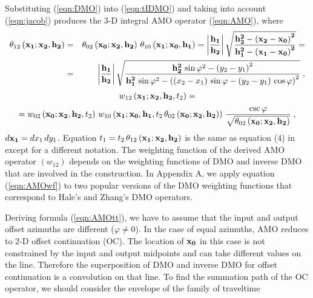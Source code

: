 \par
Substituting (\ref{eqn:DMO}) into (\ref{eqn:tIDMO}) and taking into account
(\ref{eqn:jacob}) produces the 3-D integral AMO operator (\ref{eqn:AMO}),
where
\begin{eqnarray}
\theta_{12}\left({\bf x_1;x_2, h_2}\right) & = &
\theta_{02}\left({\bf x_0;x_2, h_2}\right)\,
\theta_{10}\left({\bf x_1;x_0, h_1}\right)=
{\left|{\bf h_1 \over h_2}\right|}\,
\sqrt{{\bf {h_2^2-\left(x_2-x_0\right)^2} \over
{h_1^2-\left(x_1-x_0\right)^2}}}=
\nonumber \\
& = &
{\left|{\bf h_1 \over h_2}\right|}\,
\sqrt{{{\bf h_2^2}\,\sin{\varphi}^2-\left(y_2-y_1\right)^2} \over
{{\bf h_1^2}\,\sin{\varphi}^2-
\left(\left(x_2-x_1\right)\,\sin{\varphi}-
\left(y_2-y_1\right)\,\cos{\varphi}\right)^2}}\;,
\label{eqn:AMOtt}
\end{eqnarray}
\begin{eqnarray*}
w_{12}\left({\bf x_1;x_2, h_2},t_2\right) = 
\end{eqnarray*}
\begin{equation}
= w_{02}\left({\bf x_0;x_2, h_2},t_2\right)\,
w_{10}\left({\bf x_1;x_0, h_1},t_2\,
\theta_{02}\left({\bf x_0;x_2, h_2}\right)\right)\,
{\csc{\varphi}\over \sqrt{\theta_{02}\left({\bf x_0;x_2, h_2}\right)}}\;,
\label{eqn:AMOwf}
\end{equation}
$d{\bf x_1}=dx_1\,dy_1$. Equation 
$t_1=t_2\,\theta_{12}\left({\bf x_1;x_2, h_2}\right)$ is the same
as equation (4) in \cite{Biondi.sep.80.125} except for a different
notation. The weighting function of the derived AMO operator
$\left(w_{12}\right)$ 
depends on the weighting functions of DMO and inverse DMO that are involved in
the construction. In Appendix A, we apply equation (\ref{eqn:AMOwf}) to two
popular versions of the DMO weighting functions that
correspond to Hale's  and Zhang's
 DMO operators.
\par
Deriving formula (\ref{eqn:AMOtt}), we have to assume
that the input 
and output offset azimuths are different ($\varphi \neq 0$). In the case
of equal azimuths, AMO reduces to 2-D offset continuation (OC). The
location of ${\bf x_0}$ in this case is not constrained by the input
and output midpoints and can take different values on the line.
Therefore the superposition of DMO and inverse DMO for offset
continuation is a convolution on that line. To find the summation path
of the OC operator, we should consider the envelope of the family of traveltime
